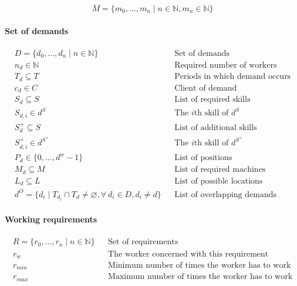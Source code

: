 \documentclass[../../thesis.tex]{subfiles}
\begin{document}
\begin{equation*}
  M = \{ m_0, \dots, m_n \mid n \in \mathbb{N}, m_n \in \mathbb{N} \}
\end{equation*}


\paragraph{Set of demands}

\begin{align*}
  D = \{ d_0, \dots, d_n \mid n \in \mathbb{N} \} && \text{Set of demands} \\
  n_d \in \mathbb{N} && \text{Required number of workers} \\ 
  T_d \subseteq T && \text{Periods in which demand occurs} \\ 
  c_d \in C && \text{Client of demand} \\ 
  S_d \subseteq S && \text{List of required skills} \\
  S_{d,i} \in d^S && \text{The $i$th skill of $d^S$} \\ 
  S^{+}_d \subseteq S && \text{List of additional skills} \\ 
  S^{+}_{d,i} \in d^{S^+} && \text{The $i$th skill of $d^{S^+}$} \\ 
  P_d \in \{ 0, \dots, d^w - 1 \} && \text{List of positions} \\
  M_d \subseteq M && \text{List of required machines} \\ 
  L_d \subseteq L && \text{List of possible locations} \\
  d^O = \{ d_i \mid T_{d_i} \cap T_d \neq \varnothing, \forall \ d_i \in D, d_i \neq d \} && \text{List of overlapping demands}
\end{align*}

\paragraph{Working requirements}

\begin{align*}
    R = \{ r_0, \dots, r_n \mid n \in \mathbb{N} \} && \text{Set of requirements} \\ 
    r_{w}   && \text{The worker concerned with this requirement} \\
    r_{min} && \text{Minimum number of times the worker has to work} \\
    r_{max} && \text{Maximum number of times the worker has to work}
\end{align*}
\end{document}
